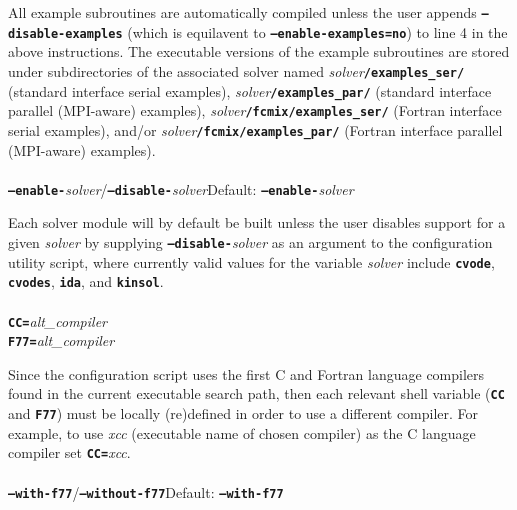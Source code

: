 \documentclass[10pt]{report}
\begin{document}
All example subroutines are automatically compiled unless the user appends \texttt{\textbf{--disable-examples}} (which is equilavent to \texttt{\textbf{--enable-examples=no}}) to line \small 4 \normalsize in the above instructions.  The executable versions of the example subroutines are stored under subdirectories of the associated solver named \textit{solver}\texttt{\textbf{/examples\_\hspace{0.2ex}ser/}} (standard interface serial examples), \textit{solver}\texttt{\textbf{/examples\_\hspace{0.2ex}par/}} (standard interface parallel (\small MPI\normalsize-aware) examples), \textit{solver}\texttt{\textbf{/fcmix/examples\_\hspace{0.2ex}ser/}} (Fortran interface serial examples), and/or \textit{solver}\texttt{\textbf{/fcmix/examples\_\hspace{0.2ex}par/}} (Fortran interface parallel (\small MPI\normalsize-aware) examples).
\\
\\
\texttt{\textbf{--enable-}}\textit{solver}/\texttt{\textbf{--disable-}}\textit{solver}\hspace{0.5in}Default: \texttt{\textbf{--enable-}}\textit{solver}\vspace{0.05in}

Each solver module will by default be built unless the user disables support for a given \textit{solver} by supplying \texttt{\textbf{--disable-}}\textit{solver} as an argument to the configuration utility script, where currently valid values for the variable \textit{solver} include \texttt{\textbf{cvode}}, \texttt{\textbf{cvodes}}, \texttt{\textbf{ida}}, and \texttt{\textbf{kinsol}}.
\\
\\
\texttt{\textbf{CC=}}\textit{alt\_compiler}\\
\texttt{\textbf{F77=}}\textit{alt\_compiler}\vspace{0.05in}

Since the configuration script uses the first C and Fortran language compilers found in the current executable search path, then each relevant shell variable (\texttt{\textbf{\small CC\normalsize}} and \texttt{\textbf{\small F77\normalsize}}) must be locally (re)defined in order to use a different compiler.  For example, to use \textit{xcc} (executable name of chosen compiler) as the C language compiler set \texttt{\textbf{CC=}}\textit{xcc}.
\\
\\
\texttt{\textbf{--with-f77}}/\texttt{\textbf{--without-f77}}\hspace{0.5in}Default: \texttt{\textbf{--with-f77}}\vspace{0.05in}
\end{document}
